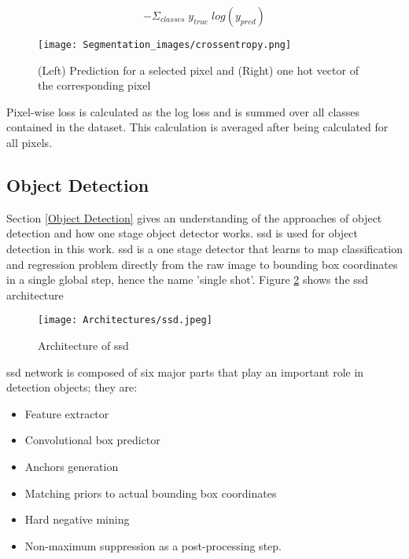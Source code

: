 \begin{equation}
    -\Sigma_{classes}\;y_{true}\;log(y_{pred})
\end{equation}


\begin{figure}[h!]
    \centering
    \texttt{[image: Segmentation\_images/crossentropy.png]}
    \caption{(Left) Prediction for a selected pixel and (Right) one hot vector of the corresponding pixel}
    \label{crossentropy}
\end{figure}

\par Pixel-wise loss is calculated as the log loss and is summed over all classes contained in the dataset. This calculation is averaged after being calculated for all pixels.

\newpage

\subsection{Object Detection} \label{OD}

Section \ref{Object Detection} gives an understanding of the approaches of object detection and how one stage object detector works. \ac{ssd} \cite{liu2016ssd} is used for object detection in this work. \ac{ssd} is a one stage detector that learns to map classification and regression problem directly from the raw image to bounding box coordinates in a single global step, hence the name 'single shot'. Figure \ref{SSD_Architecture} shows the \ac{ssd} architecture

\begin{figure}[h!]
    \centering
    \texttt{[image: Architectures/ssd.jpeg]}
    \caption{Architecture of \ac{ssd}}
    \label{SSD_Architecture}
\end{figure}

\ac{ssd} network is composed of six major parts that play an important role in detection objects; they are: 

\begin{itemize}
    \item Feature extractor
    \item Convolutional box predictor
    \item Anchors generation
    \item Matching priors to actual bounding box coordinates
    \item Hard negative mining
    \item Non-maximum suppression as a post-processing step.
\end{itemize}

